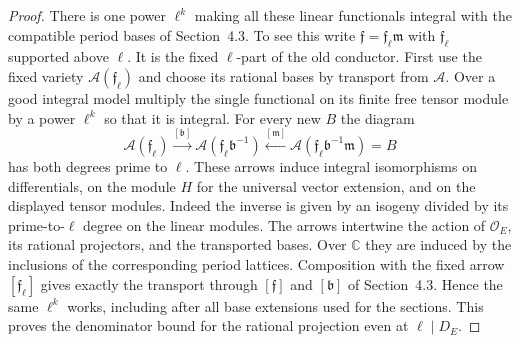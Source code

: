 \documentclass[a4paper,11pt]{article}
\theoremstyle{definition}
\theoremstyle{remark}
\numberwithin{equation}{section}
\begin{document}
\begin{proof}
There is one power \(\ell^k\) making all these linear functionals
integral with the compatible period bases of Section~4.3. To see
this write \(\mathfrak f=\mathfrak f_\ell\mathfrak m\) with
\(\mathfrak f_\ell\) supported above \(\ell\). It is the fixed
\(\ell\)-part of the old conductor. First use the fixed variety
\(\mathcal A(\mathfrak f_\ell)\) and choose its rational bases by
transport from \(\mathcal A\). Over a good integral model multiply
the single functional on its finite free tensor module by a power
\(\ell^k\) so that it is integral. For every new \(B\) the diagram
\[
  \mathcal A(\mathfrak f_\ell)
       \xrightarrow{[\mathfrak b]}
         \mathcal A(\mathfrak f_\ell\mathfrak b^{-1})
       \xleftarrow{[\mathfrak m]}
         \mathcal A(\mathfrak f_\ell\mathfrak b^{-1}\mathfrak m)
          =B
\]
has both degrees prime to \(\ell\). These arrows induce integral
isomorphisms on differentials, on the module \(H\) for the
universal vector extension, and on the displayed tensor modules.
Indeed the inverse is given by an isogeny divided by its
prime-to-\(\ell\) degree on the linear modules. The arrows
intertwine the action of \(\mathcal O_E\), its rational projectors,
and the transported bases. Over \(\mathbb C\) they are induced by
the inclusions of the corresponding period lattices. Composition
with the fixed arrow \([\mathfrak f_\ell]\) gives exactly the
transport through \([\mathfrak f]\) and \([\mathfrak b]\) of
Section~4.3. Hence the same \(\ell^k\) works, including after all
base extensions used for the sections. This proves the denominator
bound for the rational projection even at \(\ell\mid D_E\).


\end{proof}
\end{document}
